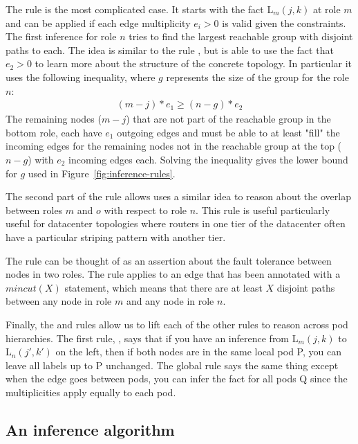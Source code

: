 \documentclass[numbers, 10pt, preprint]{sigplanconf}
\begin{document}
The rule  is the most complicated case.
It starts with the fact L$_m(j,k)$ at role $m$ and can be applied if each edge multiplicity $e_i > 0$ is valid given the constraints. The first inference for role $n$ tries to find the largest reachable group with disjoint paths to each. The idea is similar to the rule , but is able to use the fact that $e_2 > 0$ to learn more about the structure of the concrete topology. In particular it uses the following inequality, where $g$ represents the size of the group for the role $n$:
%
\[ \begin{array}{c}
  (m-j)*e_1 \geq (n-g)*e_2
\end{array} \]
\noindent
%
The remaining nodes ($m-j$) that are not part of the reachable group in the bottom role, each have $e_1$ outgoing edges and must be able to at least "fill" the incoming edges for the remaining nodes not in the reachable group at the top ($n-g$) with $e_2$ incoming edges each. Solving the inequality gives the lower bound for $g$ used in Figure~\ref{fig:inference-rules}.

The second part of the rule allows uses a similar idea to reason about the overlap between roles $m$ and $o$ with respect to role $n$. This rule is useful particularly useful for datacenter topologies where routers in one tier of the datacenter often have a particular striping pattern with another tier.

The rule  can be thought of as an assertion about the fault tolerance between nodes in two roles. The rule applies to an edge that has been annotated with a $mincut(X)$ statement, which means that there are at least $X$ disjoint paths between any node in role $m$ and any node in role $n$.

Finally, the  and  rules allow us to lift each of the other rules to reason across pod hierarchies. The first rule, , says that if you have an inference from L$_m(j,k)$ to L$_n(j',k')$ on the left, then if both nodes are in the same local pod P, you can leave all labels up to P unchanged. The global rule  says the same thing except when the edge goes between pods, you can infer the fact for all pods Q since the multiplicities apply equally to each pod.

\subsection{An inference algorithm}
\end{document}
